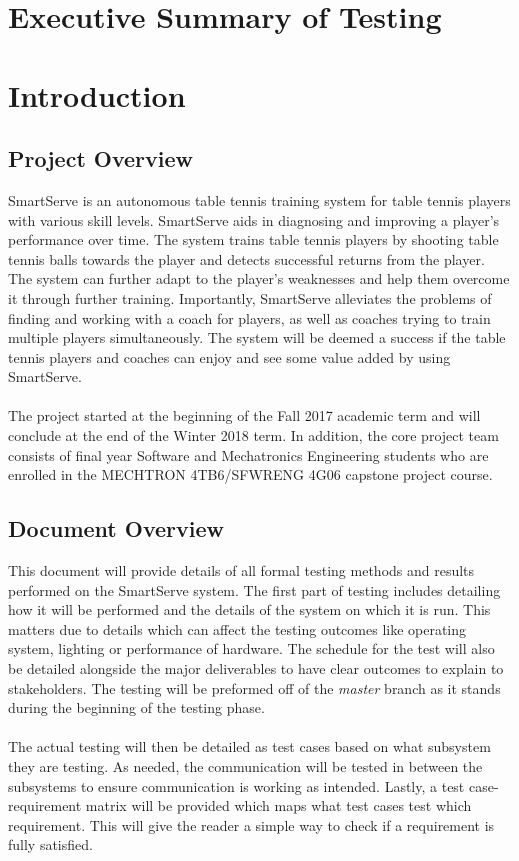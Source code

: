 \documentclass[11pt]{article}
\begin{document}
\section{Executive Summary of Testing}

\section{Introduction}
\subsection{Project Overview}
SmartServe is an autonomous table tennis training system for table tennis players with various skill levels. SmartServe aids in diagnosing and improving a player's performance over time. The system trains table tennis players by shooting table tennis balls towards the player and detects successful returns from the player. The system can further adapt to the player's weaknesses and help them overcome it through further training. Importantly, SmartServe alleviates the problems of finding and working with a coach for players, as well as coaches trying to train multiple players simultaneously. The system will be deemed a success if the table tennis players and coaches can enjoy and see some value added by using SmartServe.\\\\
The project started at the beginning of the Fall 2017 academic term and will conclude at the end of the Winter 2018 term. In addition, the core project team consists of final year Software and Mechatronics Engineering students who are enrolled in the MECHTRON 4TB6/SFWRENG 4G06 capstone project course.
\subsection{Document Overview}
This document will provide details of all formal testing methods and results performed on the SmartServe system. The first part of testing includes detailing how it will be performed and the details of the system on which it is run. This matters due to details which can affect the testing outcomes like operating system, lighting or performance of hardware. The schedule for the test will also be detailed alongside the major deliverables to have clear outcomes to explain to stakeholders. The testing will be preformed off of the \textit{master} branch as it stands during the beginning of the testing phase. \\ \\
The actual testing will then be detailed as test cases based on what subsystem they are testing. As needed, the communication will be tested in between the subsystems to ensure communication is working as intended. Lastly, a test case-requirement matrix will be provided which maps what test cases test which requirement. This will give the reader a simple way to check if a requirement is fully satisfied.
\end{document}
